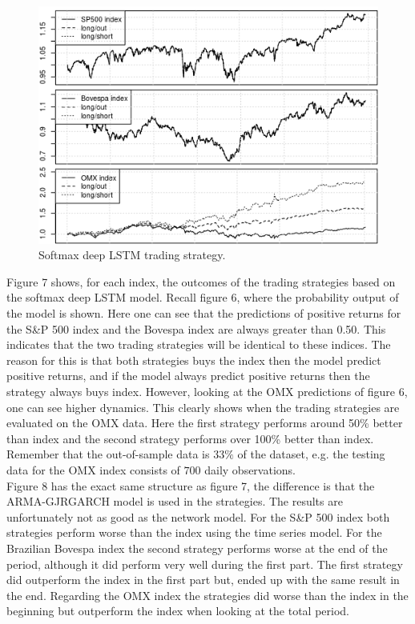 \documentclass[12pt, letterpaper]{amsart}%
\begin{document}
\begin{figure}[H]
\caption{Softmax deep LSTM trading strategy.}
\centering
\includegraphics[scale=0.8]{strategy.png}
\end{figure}
Figure 7 shows, for each index, the outcomes of the trading strategies based on the softmax deep LSTM model. Recall figure 6, where the probability output of the model is shown. Here one can see that the predictions of positive returns for the S\&P 500 index and the Bovespa index are always greater than 0.50. This indicates that the two trading strategies will be identical to these indices. The reason for this is that both strategies buys the index then the model predict positive returns, and if the model always predict positive returns then the strategy always buys index. However, looking at the OMX predictions of figure 6, one can see higher dynamics. This clearly shows when the trading strategies are evaluated on the OMX data. Here the first strategy performs around 50\% better than index and the second strategy performs over 100\% better than index. Remember that the out-of-sample data is $33\%$ of the dataset, e.g. the testing data for the OMX index consists of $700$ daily observations.
\\

Figure 8 has the exact same structure as figure 7, the difference is that the ARMA-GJRGARCH model is used in the strategies. The results are unfortunately not as good as the network model. For the S\&P 500 index both strategies perform worse than the index using the time series model. For the Brazilian Bovespa index the second strategy performs worse at the end of the period, although it did perform very well during the first part. The first strategy did outperform the index in the first part but, ended up with the same result in the end. Regarding the OMX index the strategies did worse than the index in the beginning but outperform the index when looking at the total period.
\end{document}
